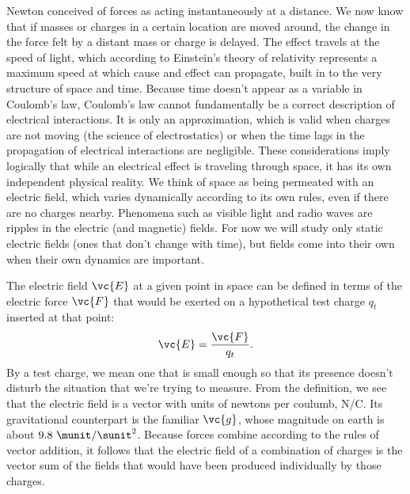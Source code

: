 Newton conceived of forces as acting instantaneously at a distance.
We now know that if masses or charges in a certain location are moved around,
the change in the force felt by a distant mass or charge is delayed. The effect
travels at the speed of light, which according to Einstein's theory of relativity
represents a maximum speed at which cause and effect can propagate, built in to
the very structure of space and time. Because time doesn't appear as a variable in
Coulomb's law, Coulomb's law cannot fundamentally be a correct description of
electrical interactions. It is only an approximation, which is valid when charges
are not moving (the science of electrostatics) or when the time lags in the propagation
of electrical interactions are negligible. These considerations imply logically that
while an electrical effect is traveling through space, it has its own independent
physical reality. We think of space as being permeated with an electric field,
which varies dynamically according to its own rules, even if there are no charges
nearby. Phenomena such as visible light and radio waves are ripples in the electric
(and magnetic) fields. For now we will study only static electric fields (ones that don't change
with time), but fields come into their own when their own dynamics are important.

The electric field $\vc{E}$ at a given point in space can be defined in terms of the electric
force $\vc{F}$ that would be exerted on a hypothetical test charge $q_t$ inserted at that
point:
\begin{equation}
  \vc{E} = \frac{\vc{F}}{q_t}.
\end{equation}
By a test charge, we mean one that is small enough so that its presence doesn't disturb
the situation that we're trying to measure. From the definition, we see that the electric
field is a vector with units of newtons per coulumb, N/C. Its gravitational counterpart
is the familiar $\vc{g}$, whose magnitude on earth is about $9.8\ \munit/\sunit^2$.
Because forces combine according to the rules of vector addition, it follows that
the electric field of a combination of charges is the vector sum of the fields that
would have been produced individually by those charges.
